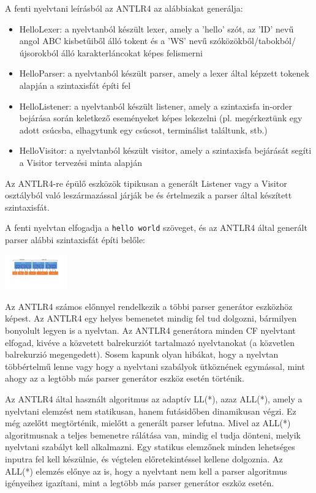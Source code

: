 \documentclass[12pt, a4paper]{report}
\newcommand{\f}[1]{\texttt{#1}}
\begin{document}
A fenti nyelvtani leírásból az ANTLR4 az alábbiakat generálja:
\begin{itemize}
	\item{HelloLexer}: a nyelvtanból készült lexer, amely a 'hello' szót, az 'ID' nevű angol ABC kisbetűiből álló tokent és a 'WS' nevű szóközökből/tabokból/újsorokból álló karakterláncokat képes felismerni
	\item{HelloParser}: a nyelvtanból készült parser, amely a lexer által képzett tokenek alapján a szintaxisfát építi fel
	\item{HelloListener}: a nyelvtanból készült listener, amely a szintaxisfa in-order bejárása során keletkező eseményeket képes lekezelni (pl. megérkeztünk egy adott csúcsba, elhagytunk egy csúcsot, terminálist találtunk, stb.)
	\item{HelloVisitor}: a nyelvtanból készült visitor, amely a szintaxisfa bejárását segíti a Visitor tervezési minta alapján
\end{itemize}

Az ANTLR4-re épülő eszközök tipikusan a generált Listener vagy a Visitor osztályból való leszármazással járják be és értelmezik a parser által készített szintaxisfát.

A fenti nyelvtan elfogadja a \f{hello world} szöveget, és az ANTLR4 által generált parser alábbi szintaxisfát építi belőle:

\begin{center}\includegraphics[trim=70 420 740 50,clip,width=0.2\textwidth,page=6]{Images.pdf}\end{center}

Az ANTLR4 számos előnnyel rendelkezik a többi parser generátor eszközhöz képest. Az ANTLR4 egy helyes bemenetet mindig fel tud dolgozni, bármilyen bonyolult legyen is a nyelvtan. Az ANTLR4 generátora minden CF nyelvtant elfogad, kivéve a közvetett balrekurziót tartalmazó nyelvtanokat (a közvetlen balrekurzió megengedett). Sosem kapunk olyan hibákat, hogy a nyelvtan többértelmű lenne vagy hogy a nyelvtani szabályok ütköznének egymással, mint ahogy az a legtöbb más parser generátor eszköz esetén történik.

Az ANTLR4 által használt algoritmus az adaptív LL(*), azaz ALL(*), amely a nyelvtani elemzést nem statikusan, hanem futásidőben dinamikusan végzi. Ez még azelőtt megtörténik, mielőtt a generált parser lefutna. Mivel az ALL(*) algoritmusnak a teljes bemenetre rálátása van, mindig el tudja dönteni, melyik nyelvtani szabályt kell alkalmazni. Egy statikus elemzőnek minden lehetséges inputra fel kell készülnie, és végtelen előretekintéssel kellene dolgoznia. Az ALL(*) elemzés előnye az is, hogy a nyelvtant nem kell a parser algoritmus igényeihez igazítani, mint a legtöbb más parser generátor eszköz esetén.
\end{document}
